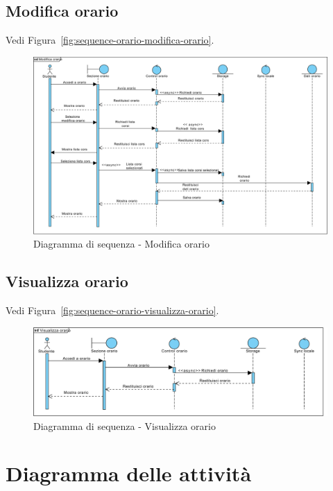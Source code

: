 \subsection{Modifica orario} %

Vedi Figura~\vref{fig:sequence-orario-modifica-orario}.

\begin{figure}
	\centering
	\includegraphics[width=\textwidth]{imgs/gruppo2/sequence-orario-modifica-orario.pdf}
	\caption{Diagramma di sequenza - Modifica orario}
	\label{fig:sequence-orario-modifica-orario}
\end{figure}

\subsection{Visualizza orario} %

Vedi Figura~\vref{fig:sequence-orario-visualizza-orario}.

\begin{figure}
	\centering
	\includegraphics[width=\textwidth]{imgs/gruppo2/sequence-orario-visualizza-orario.pdf}
	\caption{Diagramma di sequenza - Visualizza orario}
	\label{fig:sequence-orario-visualizza-orario}
\end{figure}


\section{Diagramma delle attività}

